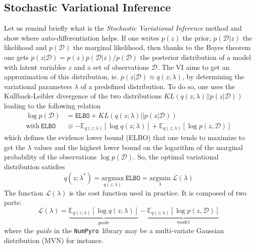 \documentclass[final,5p,times,twocolumn,authoryear]{elsarticle}
\newcommand{\numpyro}{\texttt{NumPyro}}
\begin{document}
\subsection{Stochastic Variational Inference}
\label{sec-SVI}
%
Let us remind briefly what is the \textit{Stochastic Variational Inference} method \citep{2012arXiv1206.7051H, 2017arXiv171105597Z} and show where auto-differentiation helps. If one  writes $p(z)$ the prior, $p(\mathcal{D}|z)$ the likelihood and $p(\mathcal{D})$ the marginal likelihood, then thanks to the  Bayes theorem one gets $p(z|\mathcal{D})=p(z)p(\mathcal{D}|z)/p(\mathcal{D})$ the posterior distribution of a model with latent variables $z$ and a set of observations $\mathcal{D}$. The VI aims to get an approximation of this distribution, ie. $p(z|\mathcal{D}) \approx q(z;\lambda)$, by determining the variational parameters $\lambda$ of a predefined distribution. To do so, one uses the Kullback-Leibler divergence of the two distributions $KL(q(z;\lambda)||p(z|\mathcal{D}))$ leading to the following relation
\begin{align}
\log p(\mathcal{D}) &= \mathtt{ELBO} +  KL(q(z;\lambda)||p(z|\mathcal{D})) \label{eq-ELBO} \\
\mathrm{with} \ \mathtt{ELBO} &\equiv -\mathbb{E}_{q(z;\lambda)}\left[ \log q(z;\lambda)\right] + \mathbb{E}_{q(z;\lambda)}\left[ \log p(z,\mathcal{D}) \right] 
\end{align}
which defines the evidence lower bound (ELBO) that one tends to maximize to get the $\lambda$ values and the  highest lower bound on the logarithm of the marginal probability of the observations $\log p(\mathcal{D})$. So, the optimal variational distribution satisfies
\begin{equation}
q(z;\lambda^\ast) = \underset{q(z;\lambda)}{\mathrm{argmax}}\  \mathtt{ELBO} = 
\underset{\lambda}{\mathrm{argmin}}\ \mathcal{L}(\lambda)
\end{equation}
The function $\mathcal{L}(\lambda)$ is the cost function used in practice. It is composed of two parts:
\begin{equation}
\mathcal{L}(\lambda) = \underbrace{\mathbb{E}_{q(z;\lambda)}\left[ \log q(z;\lambda)\right]}_{guide} - \underbrace{\mathbb{E}_{q(z;\lambda)}\left[ \log p(z,\mathcal{D}) \right]}_{model}
\label{eq-loss-svi-1}
\end{equation}
where the \textit{guide} in the \numpyro\ library may be a multi-variate Gaussian distribution (MVN) for instance.
\end{document}
